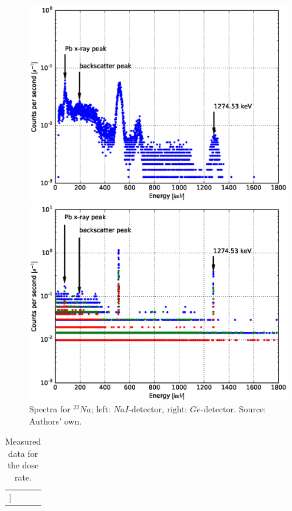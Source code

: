 \documentclass[a4paper]{article}
\begin{document}
\begin{figure}[H]
	\begin{minipage}[t]{0.5\textwidth}
		\begin{center}
		\includegraphics[width=1.0\textwidth]{plots/na22.eps}
		\end{center}
	\end{minipage}
	\begin{minipage}[t]{0.5\textwidth}
		\begin{center}
		\includegraphics[width=1.0\textwidth]{plots/na22_ged.eps}
		\end{center}
	\end{minipage}
	\caption{Spectra for $^{22}Na$; left: $NaI$-detector, right: $Ge$-detector. Source: Authors' own.}
	\label{fig:na22}
\end{figure}

\begin{table}[H]
\centering
\caption{Measured data for the dose rate.}
\begin{tabular}{r|rrr}
\hline
[[table:doserate]]
\end{tabular}
\label{tab:doserate}
\end{table}
\end{document}
